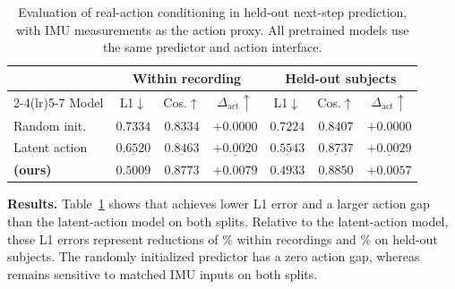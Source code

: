 \begin{table}[ht]
\centering
\small
\setlength{\tabcolsep}{4pt}
\caption{Evaluation of real-action conditioning in held-out next-step prediction, with IMU measurements as the action proxy. All pretrained models use the same predictor and action interface.}
\label{tab:mwm-wm-probe}
\begin{tabular}{lcccccc}
\toprule
& \multicolumn{3}{c}{Within recording}
& \multicolumn{3}{c}{Held-out subjects} \\
\cmidrule(lr){2-4}\cmidrule(lr){5-7}
Model & L1$\downarrow$ & Cos.$\uparrow$ & $\Delta_{\mathrm{act}}\uparrow$
& L1$\downarrow$ & Cos.$\uparrow$ & $\Delta_{\mathrm{act}}\uparrow$ \\
\midrule
Random init. & $0.7334$ & $0.8334$ & $+0.0000$ & $0.7224$ & $0.8407$ & $+0.0000$ \\
Latent action & $\underline{0.6520}$ & $\underline{0.8463}$ & $\underline{+0.0020}$ & $\underline{0.5543}$ & $\underline{0.8737}$ & $\underline{+0.0029}$ \\
\textbf{\mwm{} (ours)} & $\mathbf{0.5009}$ & $\mathbf{0.8773}$ & $\mathbf{+0.0079}$ & $\mathbf{0.4933}$ & $\mathbf{0.8850}$ & $\mathbf{+0.0057}$ \\
\bottomrule
\end{tabular}

\end{table}

\noindent\textbf{Results.}
Table~\ref{tab:mwm-wm-probe} shows that \mwm{} achieves lower L1 error and a larger action gap than the latent-action model on both splits. Relative to the latent-action model, these L1 errors represent reductions of \mwmWMWithinGainPct{}\% within recordings and \mwmWMSubjectGainPct{}\% on held-out subjects. The randomly initialized predictor has a zero action gap, whereas \mwm{} remains sensitive to matched IMU inputs on both splits.
